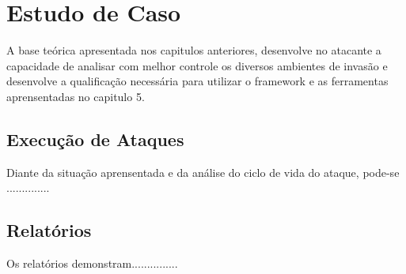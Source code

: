 \chapter{Estudo de Caso}
A base teórica apresentada nos capitulos anteriores, desenvolve no atacante a capacidade de analisar com melhor controle os diversos ambientes de invasão e desenvolve a qualificação necessária para utilizar o framework e as ferramentas aprensentadas no capitulo 5.
\section{Execução de Ataques}
Diante da situação aprensentada e da análise do ciclo de vida do ataque, pode-se ..............
\section{Relatórios}
Os relatórios demonstram...............
